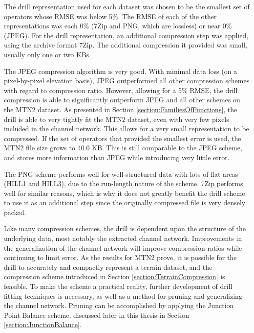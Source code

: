 The drill representation used for each dataset was chosen to be the smallest set of operators whose RMSE was below 5\%. The RMSE of each of the other representations was each 0\% (7Zip and PNG, which are lossless) or near 0\% (JPEG). For the drill representation, an additional compression step was applied, using the archive format 7Zip. The additional compression it provided was small, usually only one or two KBs.

The JPEG compression algorithm is very good. With minimal data loss (on a pixel-by-pixel elevation basis), JPEG outperformed all other compression schemes with regard to compression ratio. However, allowing for a 5\% RMSE, the drill compression is able to significantly outperform JPEG and all other schemes on the MTN2 dataset. As presented in Section \ref{section:FamiliesOfFunctions}, the drill is able to very tightly fit the MTN2 dataset, even with very few pixels included in the channel network. This allows for a very small representation to be compressed. 
If the set of operators that provided the smallest error is used, the MTN2 file size grows to  40.0 KB. This is still comparable to the JPEG scheme, and stores more information than JPEG while introducing very little error. 

The PNG scheme performs well for well-structured data with lots of flat areas (HILL1 and HILL3), due to the run-length nature of the scheme. 7Zip performs well for similar reasons, which is why it does not greatly benefit the drill scheme to use it as an additional step since the originally compressed file is very densely packed. 

Like many compression schemes, the drill is dependent upon the structure of the underlying data, most notably the extracted channel network. Improvements in the generalization of the channel network will improve compression ratios while continuing to limit error. As the results for MTN2 prove, it is possible for the drill to accurately and compactly represent a terrain dataset, and the compression scheme introduced in Section \ref{section:TerrainCompression} is feasible. 
To make the scheme a practical reality, further development of drill fitting techniques is necessary, as well as a method for pruning and generalizing the channel network. Pruning can be accomplished by applying the Junction Point Balance scheme, discussed later in this thesis in Section \ref{section:JunctionBalance}.


